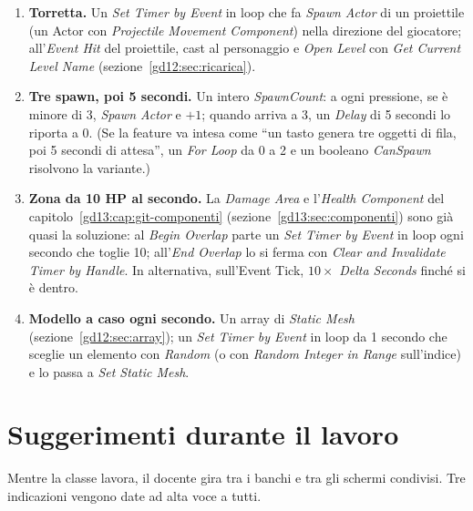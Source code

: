 \begin{enumerate}
        \emph{Random Bool with Weight} con peso $0{,}35$; se esce falso,
        \emph{Destroy Actor}. Farlo al Begin Play, prima che il giocatore
        possa vederlo, è ciò che rende la sparizione invisibile; per lo stesso
        motivo l'oggetto non deve lasciare tracce (collisioni, luci, suoni
        legati ad altri Actor).
  \item \textbf{Torretta.} Un \emph{Set Timer by Event} in loop che fa
        \emph{Spawn Actor} di un proiettile (un Actor con \emph{Projectile
        Movement Component}) nella direzione del giocatore; all'\emph{Event
        Hit} del proiettile, cast al personaggio e \emph{Open Level} con
        \emph{Get Current Level Name} (sezione~\ref{gd12:sec:ricarica}).
  \item \textbf{Tre spawn, poi 5 secondi.} Un intero \emph{SpawnCount}: a ogni
        pressione, se è minore di 3, \emph{Spawn Actor} e $+1$; quando arriva a
        3, un \emph{Delay} di 5 secondi lo riporta a 0. (Se la feature va
        intesa come ``un tasto genera tre oggetti di fila, poi 5 secondi di
        attesa'', un \emph{For Loop} da 0 a 2 e un booleano
        \emph{CanSpawn} risolvono la variante.)
  \item \textbf{Zona da 10 HP al secondo.} La \emph{Damage Area} e
        l'\emph{Health Component} del capitolo~\ref{gd13:cap:git-componenti}
        (sezione~\ref{gd13:sec:componenti}) sono già quasi la soluzione: al
        \emph{Begin Overlap} parte un \emph{Set Timer by Event} in loop ogni
        secondo che toglie 10; all'\emph{End Overlap} lo si ferma con
        \emph{Clear and Invalidate Timer by Handle}. In alternativa, sull'Event
        Tick, $10 \times$ \emph{Delta Seconds} finché si è dentro.
  \item \textbf{Modello a caso ogni secondo.} Un array di \emph{Static Mesh}
        (sezione~\ref{gd12:sec:array}); un \emph{Set Timer by Event} in loop da 1
        secondo che sceglie un elemento con \emph{Random} (o con \emph{Random
        Integer in Range} sull'indice) e lo passa a \emph{Set Static Mesh}.
\end{enumerate}

\section{Suggerimenti durante il lavoro}
\label{gd16:sec:suggerimenti}

Mentre la classe lavora, il docente gira tra i banchi e tra gli schermi
condivisi. Tre indicazioni vengono date ad alta voce a tutti.

